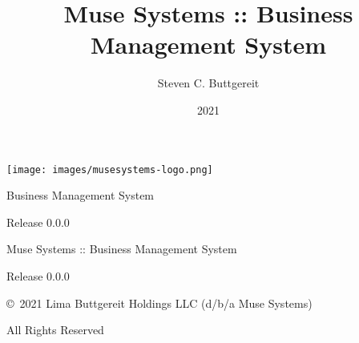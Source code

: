 \documentclass[10pt,letterpaper]{book}
\author{Steven C. Buttgereit}
\title{Muse Systems :: Business Management System}
\date{2021}
\begin{document}
\begin{titlepage}
    \vspace*{4cm}

    \centering
    \texttt{[image: images/musesystems-logo.png]}

    \vspace*{1cm}

    \Huge{\textsf{Business Management System}}

    \vspace*{2cm}
    \large{Release 0.0.0}
\end{titlepage}
\pagestyle{empty}
\centerline{Muse Systems :: Business Management System}
\centerline{Release 0.0.0}
\vspace{2cm}
\centerline{\copyright~2021 Lima Buttgereit Holdings LLC (d/b/a Muse Systems)}
\centerline{All Rights Reserved}
\tableofcontents
\mainmatter


\end{document}

